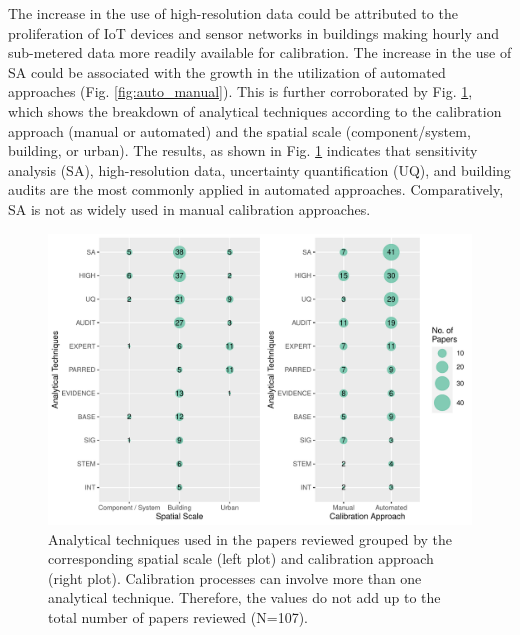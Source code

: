 \documentclass[review]{elsarticle}
\begin{document}
The increase in the use of high-resolution data could be attributed to the proliferation of IoT devices and sensor networks in buildings making hourly and sub-metered data more readily available for calibration. The increase in the use of SA could be associated with the growth in the utilization of automated approaches (Fig. \ref{fig:auto_manual}). This is further corroborated by Fig. \ref{fig:analytical_approach}, which shows the breakdown of analytical techniques according to the calibration approach (manual or automated) and the spatial scale (component/system, building, or urban). The results, as shown in Fig. \ref{fig:analytical_approach} indicates that sensitivity analysis (SA), high-resolution data, uncertainty quantification (UQ), and building audits are the most commonly applied in automated approaches. Comparatively, SA is not as widely used in manual calibration approaches. 

\begin{figure}[!h]
\centering
\includegraphics[width=\textwidth]{figures/approach_scale.pdf}
\caption{Analytical techniques used in the papers reviewed grouped by the corresponding spatial scale (left plot) and calibration approach (right plot). Calibration processes can involve more than one analytical technique. Therefore, the values do not add up to the total number of papers reviewed (N=107).}
\label{fig:analytical_approach}
\end{figure}
\end{document}
